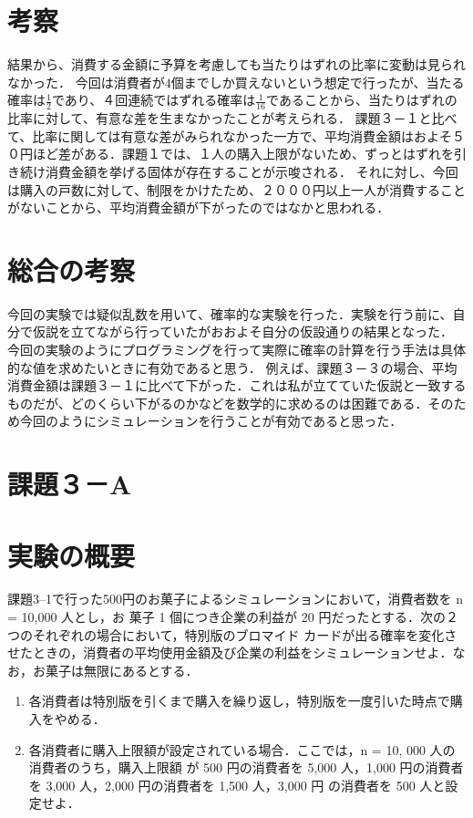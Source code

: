 \documentclass[fleqn, a4paper. 12pt]{ltjsarticle} %
\begin{document}
\section*{考察}
結果から、消費する金額に予算を考慮しても当たりはずれの比率に変動は見られなかった．
今回は消費者が$4$個までしか買えないという想定で行ったが、当たる確率は$\frac{1}{2}$であり、４回連続ではずれる確率は$\frac{1}{16}$であることから、当たりはずれの比率に対して、有意な差を生まなかったことが考えられる．
課題３－１と比べて、比率に関しては有意な差がみられなかった一方で、平均消費金額はおよそ５０円ほど差がある．課題１では、１人の購入上限がないため、ずっとはずれを引き続け消費金額を挙げる固体が存在することが示唆される．
それに対し、今回は購入の戸数に対して、制限をかけたため、２０００円以上一人が消費することがないことから、平均消費金額が下がったのではなかと思われる．
\section*{総合の考察}
今回の実験では疑似乱数を用いて、確率的な実験を行った．実験を行う前に、自分で仮説を立てながら行っていたがおおよそ自分の仮設通りの結果となった．
今回の実験のようにプログラミングを行って実際に確率の計算を行う手法は具体的な値を求めたいときに有効であると思う．
例えば、課題３－３の場合、平均消費金額は課題３－１に比べて下がった．これは私が立てていた仮説と一致するものだが、どのくらい下がるのかなどを数学的に求めるのは困難である．そのため今回のようにシミュレーションを行うことが有効であると思った．

 

\newpage
\section*{課題３－A}
\section*{実験の概要}

課題3–1で行った500円のお菓子によるシミュレーションにおいて，消費者数を n = 10,000 人とし，お
菓子 1 個につき企業の利益が 20 円だったとする．次の２つのそれぞれの場合において，特別版のブロマイド
カードが出る確率を変化させたときの，消費者の平均使用金額及び企業の利益をシミュレーションせよ．な
お，お菓子は無限にあるとする．
\begin{enumerate}
  \item 各消費者は特別版を引くまで購入を繰り返し，特別版を一度引いた時点で購入をやめる．
  \item 各消費者に購入上限額が設定されている場合．ここでは，n = 10, 000 人の消費者のうち，購入上限額
  が 500 円の消費者を 5,000 人，1,000 円の消費者を 3,000 人，2,000 円の消費者を 1,500 人，3,000 円
  の消費者を 500 人と設定せよ．
\end{enumerate}
\end{document}
